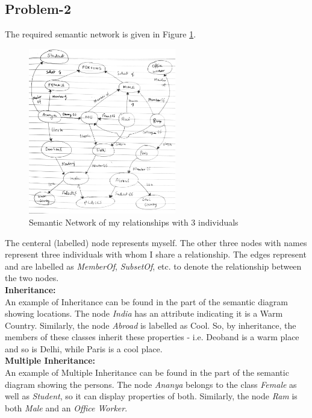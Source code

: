 \documentclass[12pt]{article}
\begin{document}
    \subsection*{Problem-2}
    The required semantic network is given in Figure \ref{fig:semantic-net}.
    \begin{figure}[htbp]
        \centering
        \includegraphics[width=0.574\textwidth]{Assets/semantic-net.jpg}
        \caption{Semantic Network of my relationships with 3 individuals}
        \label{fig:semantic-net}
    \end{figure}
    The centeral (labelled) node represents myself. The other three nodes with names represent three individuals
    with whom I share a relationship. The edges represent and are labelled as \textit{MemberOf}, \textit{SubsetOf},
    etc. to denote the relationship between the two nodes. \\[5pt]
    \textbf{Inheritance:} \\
    An example of Inheritance can be found in the part of the semantic diagram showing
    locations. The node \textit{India} has an attribute indicating it is a Warm Country. Similarly,
    the node \textit{Abroad} is labelled as Cool. So, by inheritance, the members of these
    classes inherit these properties - i.e. Deoband is a warm place and so is Delhi, while Paris
    is a cool place. \\[5pt]
    \textbf{Multiple Inheritance:} \\
    An example of Multiple Inheritance can be found in the part of the semantic diagram showing
    the persons. The node \textit{Ananya} belongs to the class \textit{Female} as well as \textit{Student}, so
    it can display properties of both. Similarly, the node \textit{Ram} is both \textit{Male} and an
    \textit{Office Worker}.
\end{document}
